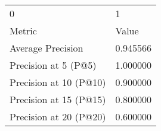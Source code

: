 \begin{tabular}{ll}
0 & 1 \\
Metric & Value \\
Average Precision & 0.945566 \\
Precision at 5 (P@5) & 1.000000 \\
Precision at 10 (P@10) & 0.900000 \\
Precision at 15 (P@15) & 0.800000 \\
Precision at 20 (P@20) & 0.600000 \\
\end{tabular}
